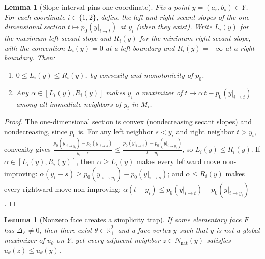 \documentclass[11pt]{article}
\newtheorem{lemma}[theorem]{Lemma}
\newcommand{\R}{\mathbb{R}}
\newcommand{\Rp}{\R_+}
\begin{document}
\begin{lemma}[Slope interval pins one coordinate]\label{lem:slopepin}
Fix a point $y = (a_r, b_s) \in Y$.  For each coordinate $i \in \{1,2\}$, define
the left and right secant slopes of the one-dimensional section
$t \mapsto p_0(y|_{i \to t})$ at $y_i$ (when they exist).
Write $L_i(y)$ for the maximum left secant slope and $R_i(y)$ for the minimum
right secant slope, with the convention $L_i(y) = 0$ at a left boundary and
$R_i(y) = +\infty$ at a right boundary.  Then:
\begin{enumerate}[label=(\alph*)]
  \item $0 \leq L_i(y) \leq R_i(y)$, by convexity and monotonicity of $p_0$.
  \item Any $\alpha \in [L_i(y), R_i(y)]$ makes $y_i$ a maximizer of
    $t \mapsto \alpha\, t - p_0(y|_{i \to t})$ among all immediate neighbors
    of $y_i$ in $M_i$.
\end{enumerate}
\end{lemma}

\begin{proof}
The one-dimensional section is convex (nondecreasing secant slopes) and
nondecreasing, since $p_0$ is.  For any left neighbor $s < y_i$ and right
neighbor $t > y_i$, convexity gives
$\frac{p_0(y|_{i\to y_i}) - p_0(y|_{i\to s})}{y_i - s}
\leq \frac{p_0(y|_{i\to t}) - p_0(y|_{i\to y_i})}{t - y_i}$,
so $L_i(y) \leq R_i(y)$.
If $\alpha \in [L_i(y), R_i(y)]$, then $\alpha \geq L_i(y)$ makes every
leftward move non-improving:
$\alpha(y_i - s) \geq p_0(y|_{i\to y_i}) - p_0(y|_{i\to s})$;
and $\alpha \leq R_i(y)$ makes every rightward move non-improving:
$\alpha(t - y_i) \leq p_0(y|_{i\to t}) - p_0(y|_{i\to y_i})$.
\end{proof}

\begin{lemma}[Nonzero face creates a simplicity trap]\label{lem:trap}
If some elementary face $F$ has $\Delta_F \neq 0$, then there exist
$\theta \in \Rp^2$ and a face vertex $y$ such that $y$ is not a global
maximizer of $u_\theta$ on $Y$, yet every adjacent neighbor $z \in N_{\mathrm{nat}}(y)$
satisfies $u_\theta(z) \leq u_\theta(y)$.
\end{lemma}
\end{document}
